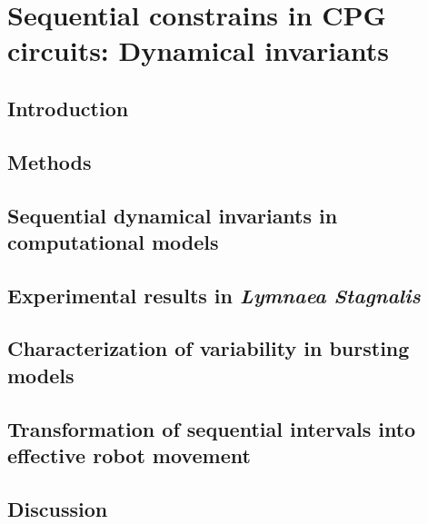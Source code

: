 \chapter{Sequential constrains in CPG circuits: Dynamical invariants}
\label{c-invariants}
\section{Introduction}

\section{Methods}

\section{Sequential dynamical invariants in computational models}
\label{c-invariants-model}

\section{Experimental results in \textit{Lymnaea Stagnalis}}

\section{Characterization of variability in bursting models}

\section{Transformation of sequential intervals into effective robot movement}

\section{Discussion}
